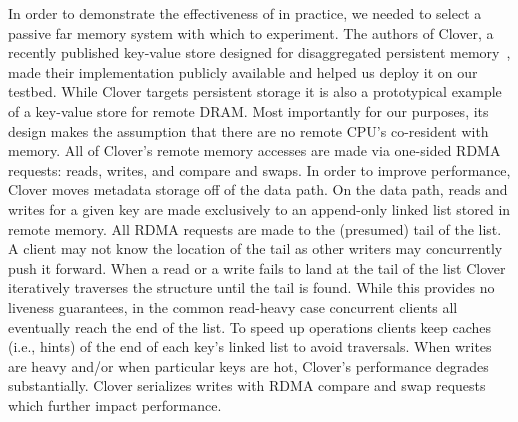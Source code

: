 In order to demonstrate the effectiveness of {\sword} in practice, we
needed to select a passive far memory system with which to experiment.
The authors of Clover, a recently published key-value store designed
for disaggregated persistent memory~\cite{clover}, made their
implementation publicly available and helped us deploy it on our
testbed. While Clover targets persistent storage it is also a
prototypical example of a key-value store for remote DRAM.  Most
importantly for our purposes, its design makes the assumption that
there are no remote CPU's co-resident with memory. All of Clover's
remote memory accesses are made via one-sided RDMA requests: reads,
writes, and compare and swaps.  In order to improve performance,
Clover moves metadata storage off of the data path. On the data path,
reads and writes for a given key are made exclusively to an
append-only linked list stored in remote memory. All RDMA requests are
made to the (presumed) tail of the list. A client may not know the
location of the tail as other writers may concurrently push it
forward.  When a read or a write fails to land at the tail of the list
Clover iteratively traverses the structure until the tail is
found. While this provides no liveness guarantees, in the common
read-heavy case concurrent clients all eventually reach the end of the
list. To speed up operations clients keep caches (i.e., hints) of the
end of each key's linked list to avoid traversals. When writes are
heavy and/or when particular keys are hot, Clover's performance
degrades substantially. Clover serializes writes with RDMA compare and swap
requests which further impact performance.

